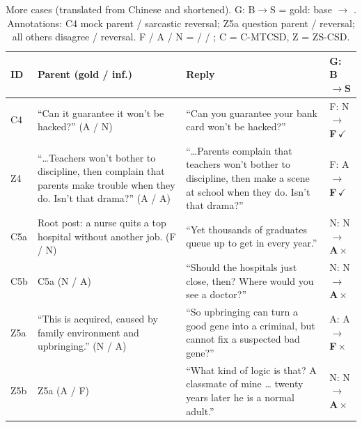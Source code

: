 \begin{table}[H]
\centering
\caption{More cases (translated from Chinese and shortened). G: B$\rightarrow$S = gold: base $\rightarrow$ \spin{}. Annotations: C4 mock parent / sarcastic reversal; Z5a question parent / reversal; all others disagree / reversal. F / A / N = \favor{} / \against{} / \nonelabel{}; C = C-MTCSD, Z = ZS-CSD.}
\label{tab:more-cases}
\footnotesize
\setlength{\tabcolsep}{2.5pt}
\renewcommand{\arraystretch}{1.05}
\begin{tabular}{@{}p{0.5cm}p{2.7cm}p{2.7cm}p{1.25cm}@{}}
\toprule
ID & Parent (gold / inf.) & Reply & G: B$\rightarrow$S \\
\midrule
C4 & ``Can it guarantee it won't be hacked?'' (A / N) & ``Can you guarantee your bank card won't be hacked?'' & F: N$\rightarrow$\textbf{F}\,$\checkmark$ \\
Z4 & ``\ldots Teachers won't bother to discipline, then complain that parents make trouble when they do. Isn't that drama?'' (A / A) & ``\ldots Parents complain that teachers won't bother to discipline, then make a scene at school when they do. Isn't that drama?'' & F: A$\rightarrow$\textbf{F}\,$\checkmark$ \\
\midrule
C5a & Root post: a nurse quits a top hospital without another job. (F / N) & ``Yet thousands of graduates queue up to get in every year.'' & N: N$\rightarrow$\textbf{A}\,$\times$ \\
C5b & C5a (N / A) & ``Should the hospitals just close, then? Where would you see a doctor?'' & N: N$\rightarrow$\textbf{A}\,$\times$ \\
Z5a & ``This is acquired, caused by family environment and upbringing.'' (N / A) & ``So upbringing can turn a good gene into a criminal, but cannot fix a suspected bad gene?'' & A: A$\rightarrow$\textbf{F}\,$\times$ \\
Z5b & Z5a (A / F) & ``What kind of logic is that? A classmate of mine \ldots{} twenty years later he is a normal adult.'' & N: N$\rightarrow$\textbf{A}\,$\times$ \\
\bottomrule
\end{tabular}
\end{table}


